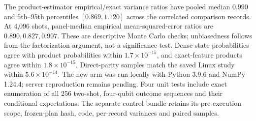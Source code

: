 The product-estimator empirical/exact variance ratios have pooled
median $0.990$ and 5th--95th percentiles $[0.869,1.120]$ across
the correlated comparison records. At 4,096 shots, panel-median
empirical mean-squared-error ratios are $0.890,0.827,0.907$.
These are descriptive Monte Carlo checks; unbiasedness follows from
the factorization argument, not a significance test. Dense-state
probabilities agree with product probabilities within
$1.7\times10^{-15}$, and exact-feature products agree within
$1.8\times10^{-15}$. Direct-parity samples match the saved Linux
study within $5.6\times10^{-14}$. The new arm was run locally with
Python 3.9.6 and NumPy 1.24.4; server reproduction remains pending.
Four unit tests include exact enumeration of all 256 two-shot,
four-qubit outcome sequences and their conditional expectations.
The separate control bundle retains its pre-execution scope,
frozen-plan hash, code, per-record variances and paired samples.

